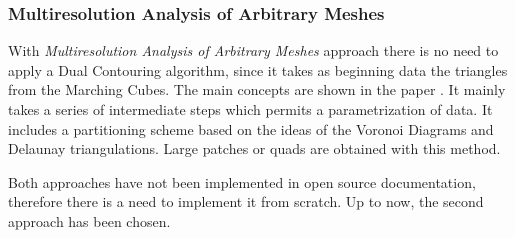 

\subsubsection{Multiresolution Analysis of Arbitrary Meshes}
With \textit{Multiresolution Analysis of Arbitrary Meshes} approach there is no need to apply a Dual Contouring algorithm, since it takes as
beginning data the triangles from the Marching Cubes. The main concepts are shown in the paper \cite{eck1996automatic}. It mainly takes a series of intermediate steps which permits a parametrization of data. It includes a partitioning scheme based on the ideas of the Voronoi Diagrams and Delaunay triangulations. Large patches or quads are obtained with this method. 


Both approaches have not been implemented in open source documentation, therefore there is a need to implement it from scratch. Up to now, the second approach has been chosen.

